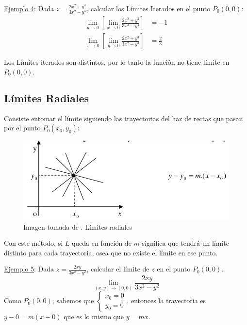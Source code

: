\documentclass[12pt]{article}
\begin{document}
\underline{Ejemplo 4}:
Dada $ z = \frac{2x^{2} + y^{3}}{3x^{2} - y^{3}} $, calcular los Límites Iterados en el punto $ P_{0}(0,0) $:
\begin{align*}
	\lim_{y \to 0}{\left[\lim_{x \to 0}{\frac{2x^{2} + y^{3}}{3x^{2} - y^{3}}}\right]} &= -1\\
	\lim_{x \to 0}{\left[\lim_{y \to 0}{\frac{2x^{2} + y^{3}}{3x^{2} - y^{3}}}\right]} &= \frac{2}{3}
\end{align*}

Los Límites iterados son distintos, por lo tanto la función no tiene límite en $ P_{0}(0,0) $.


\subsection{Límites Radiales}
Consiste entomar el límite siguiendo las trayectorias del haz de rectas que pasan por el punto $ P_{0}(x_{0}, y_{0}) $:

\begin{figure}[H]
  \centering
  \includegraphics[width=0.5\linewidth]{imagenes/limites_radiales.png}
  \caption{Imagen tomada de \parencite{am2monllor}. Límites radiales}
  \label{fig:limites_radiales}
\end{figure}

Con este método, si $ L $ queda en función de $ m $ significa que tendrá un límite distinto para cada trayectoria, osea que no existe el límite en ese punto.

\underline{Ejemplo 5}:
Dada $ z = \frac{2xy}{3x^{2} - y^{2}} $, calcular el límite de $ z $ en el punto $ P_{0}(0,0) $.
\[
\lim_{(x,y) \to (0,0)}{\frac{2xy}{3x^{2} - y^{2}}}
\]
Como $ P_{0}(0,0) $, sabemos que $ \begin{cases}
  x_{0} = 0 \\
  y_{0} = 0
\end{cases} $, entonces la trayectoria es $ y - 0 = m(x-0) $ que es lo mismo que $ y = mx $.
\end{document}
